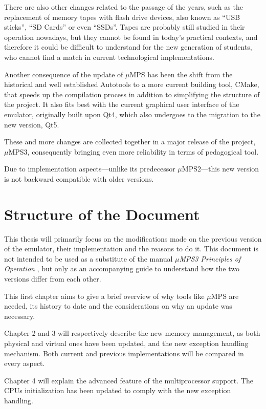\documentclass[12pt,a4paper,openright,twoside]{report}
\begin{document}
There are also other changes related to the passage of the years, such as the replacement of memory tapes with flash drive devices, also known as ``USB sticks'', ``SD Cards'' or even ``SSDs''.
Tapes are probably still studied in their operation nowadays, but they cannot be found in today's practical contexts, and therefore it could be difficult to understand for the new generation of students, who cannot find a match in current technological implementations.

Another consequence of the update of $\mu$MPS has been the shift from the historical and well established Autotools to a more current building tool, CMake, that speeds up the compilation process in addition to simplifying the structure of the project.
It also fits best with the current graphical user interface of the emulator, originally built upon Qt4, which also undergoes to the migration to the new version, Qt5.

These and more changes are collected together in a major release of the project, $\mu$MPS3, consequently bringing even more reliability in terms of pedagogical tool.

Due to implementation aspects---unlike its predecessor $\mu$MPS2---this new version is not backward compatible with older versions.

\section{Structure of the Document}
This thesis will primarily focus on the modifications made on the previous version of the emulator, their implementation and the reasons to do it.
This document is not intended to be used as a substitute of the manual \textit{$\mu$MPS3 Principles of Operation} \cite{pops}, but only as an accompanying guide to understand how the two versions differ from each other.

This first chapter aims to give a brief overview of why tools like $\mu$MPS are needed, its history to date and the considerations on why an update was necessary.

Chapter 2 and 3 will respectively describe the new memory management, as both physical and virtual ones have been updated, and the new exception handling mechanism.
Both current and previous implementations will be compared in every aspect.

Chapter 4 will explain the advanced feature of the multiprocessor support.
The CPUs initialization has been updated to comply with the new exception handling.
\end{document}
